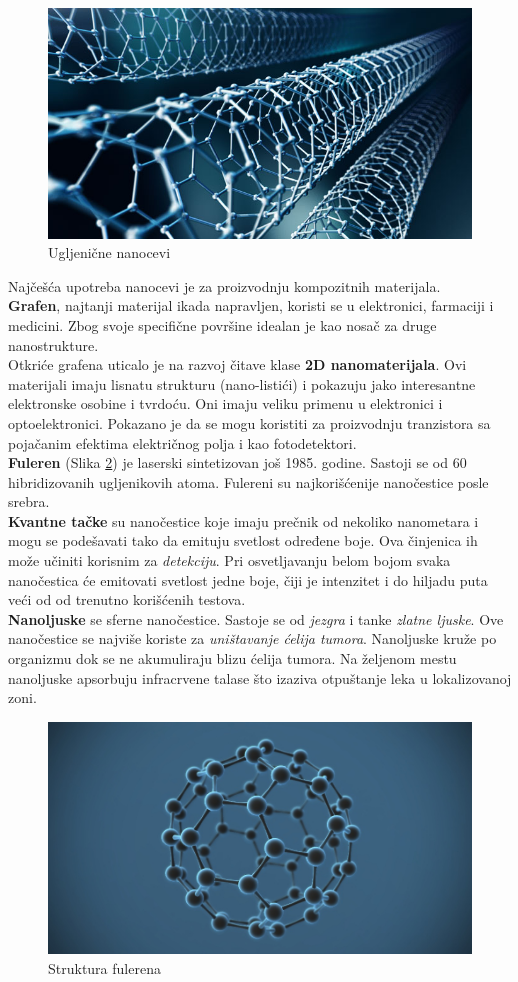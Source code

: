 \documentclass[a4paper]{article}
\begin{document}
\begin{figure}[H]
    \centering
    \includegraphics[width=.6\textwidth]{slika 2.jpg}
    \caption{Ugljenične nanocevi}
    \label{slika_nanocevi}
\end{figure}

Najčešća upotreba nanocevi je za proizvodnju kompozitnih materijala.\\

\textbf{Grafen}, najtanji materijal ikada napravljen, koristi se u elektronici, farmaciji i medicini. Zbog svoje specifične površine idealan je kao nosač za druge nanostrukture.\\

Otkriće grafena uticalo je na razvoj čitave klase \textbf{2D nanomaterijala}. Ovi materijali imaju lisnatu strukturu (nano-listići) i pokazuju jako interesantne elektronske osobine i tvrdoću. Oni imaju veliku primenu u elektronici i optoelektronici. Pokazano je da se mogu koristiti za proizvodnju tranzistora sa pojačanim efektima električnog polja i kao fotodetektori.\\

\textbf{Fuleren} (Slika \ref{slika_fuleren}) je laserski sintetizovan još 1985. godine. Sastoji se od 60 hibridizovanih ugljenikovih atoma. Fulereni su najkorišćenije nanočestice posle srebra.\\ 

\textbf{Kvantne tačke} su nanočestice koje imaju prečnik od nekoliko nanometara i mogu se podešavati tako da emituju svetlost određene boje. Ova činjenica ih može učiniti korisnim za \emph{detekciju}. Pri osvetljavanju belom bojom svaka nanočestica će emitovati svetlost jedne boje, čiji je intenzitet i do hiljadu puta veći od od trenutno korišćenih testova.\\

\textbf{Nanoljuske} se sferne nanočestice. Sastoje se od \emph{jezgra} i tanke \emph{zlatne ljuske}. Ove nanočestice se najviše koriste za \emph{uništavanje ćelija tumora}. Nanoljuske kruže po organizmu dok se ne akumuliraju blizu ćelija tumora. Na željenom mestu nanoljuske apsorbuju infracrvene talase što izaziva otpuštanje leka u lokalizovanoj zoni.\\

\begin{figure}[H]
    \centering
    \includegraphics[width=.4\textwidth]{slika 3.jpg}
    \caption{Struktura fulerena}
    \label{slika_fuleren}
\end{figure}
\end{document}

